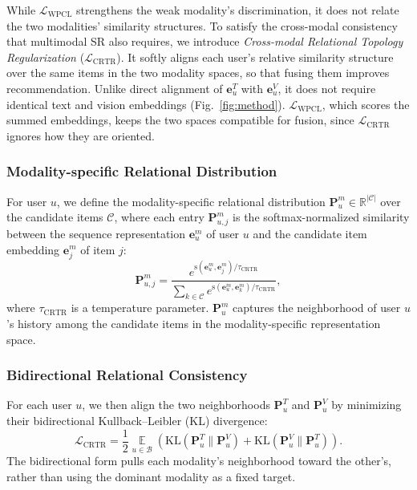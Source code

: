 While $\mathcal{L}_{\text{WPCL}}$ strengthens the weak modality's discrimination, it does not relate the two modalities' similarity structures.
To satisfy the cross-modal consistency that multimodal SR also requires, we introduce \textit{Cross-modal Relational Topology Regularization} ($\mathcal{L}_{\text{CRTR}}$).
It softly aligns each user's relative similarity structure over the same items in the two modality spaces, so that fusing them improves recommendation.
Unlike direct alignment of $\mathbf{e}_u^T$ with $\mathbf{e}_u^V$, it does not require identical text and vision embeddings (Fig.~\ref{fig:method}).
$\mathcal{L}_{\text{WPCL}}$, which scores the summed embeddings, keeps the two spaces compatible for fusion, since $\mathcal{L}_{\text{CRTR}}$ ignores how they are oriented.

\subsubsection{\textbf{Modality-specific Relational Distribution}}
For user $u$, we define the modality-specific relational distribution $\mathbf{P}^m_u \in \mathbb{R}^{|\mathcal{C}|}$ over the candidate items $\mathcal{C}$, where each entry $\mathbf{P}_{u,j}^m$ is the softmax-normalized similarity between the sequence representation $\mathbf{e}_u^m$ of user $u$ and the candidate item embedding $\mathbf{e}_j^m$ of item $j$:
\begin{equation}
    \mathbf{P}_{u,j}^m = \frac{e^{\text{s}(\mathbf{e}_u^m, \mathbf{e}_j^m) / \tau_{\text{CRTR}}}}{\sum_{k\in\mathcal{C}} e^{\text{s}(\mathbf{e}_u^m, \mathbf{e}_k^m) / \tau_{\text{CRTR}}}},
\end{equation}
where $\tau_{\text{CRTR}}$ is a temperature parameter.
$\mathbf{P}_u^m$ captures the neighborhood of user $u$'s history among the candidate items in the modality-specific representation space.

\subsubsection{\textbf{Bidirectional Relational Consistency}}
For each user $u$, we then align the two neighborhoods $\mathbf{P}^T_u$ and $\mathbf{P}^V_u$ by minimizing their bidirectional Kullback--Leibler (KL) divergence:
\begin{equation}
\mathcal{L}_{\text{CRTR}} = \frac{1}{2}\mathop{\mathbb{E}}\limits_{u \in \mathcal{B}} \left( \mathrm{KL}(\mathbf{P}_u^T \| \mathbf{P}_u^V) + \mathrm{KL}(\mathbf{P}_u^V \| \mathbf{P}_u^T) \right).
\end{equation}
The bidirectional form pulls each modality's neighborhood toward the other's, rather than using the dominant modality as a fixed target.

